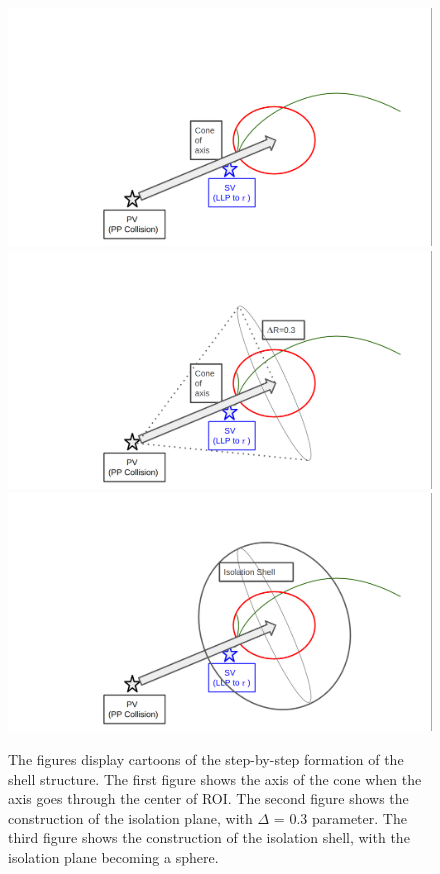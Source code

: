 \begin{figure}[h!]
  \centering
  \includegraphics[width=0.65\linewidth]{figs/ROICT4.png}
  \includegraphics[width=0.65\linewidth]{figs/ROICT5.png}
  \includegraphics[width=0.65\linewidth]{figs/ROICT6.png}
\caption{
        The figures display cartoons of the step-by-step formation of the shell structure.
        The first figure shows the axis of the cone when the axis goes through the center of ROI.
        The second figure shows the construction of the isolation plane, with $\Delta$ = 0.3 parameter.
        The third figure shows the construction of the isolation shell, with the isolation plane becoming a sphere.
	}
  \label{fig:Clustering2}
\end{figure}

